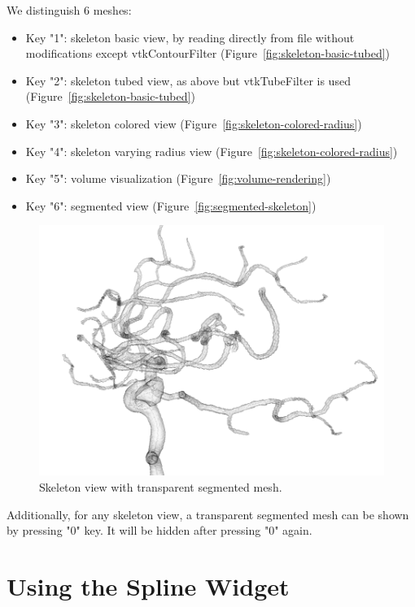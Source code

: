 We distinguish 6 meshes:
\begin{itemize}
	\item Key "1": skeleton basic view, by reading directly from file without modifications except vtkContourFilter (Figure~\ref{fig:skeleton-basic-tubed})
	\item Key "2": skeleton tubed view, as above but vtkTubeFilter is used (Figure~\ref{fig:skeleton-basic-tubed})
	\item Key "3": skeleton colored view (Figure~\ref{fig:skeleton-colored-radius})
	\item Key "4": skeleton varying radius view (Figure~\ref{fig:skeleton-colored-radius})
	\item Key "5": volume visualization (Figure~\ref{fig:volume-rendering})
	\item Key "6": segmented view (Figure~\ref{fig:segmented-skeleton})
\end{itemize}

\begin{figure}
	\centering
	\includegraphics[scale=0.4]{fig/skeleton-transparent-segmented}
	\caption{Skeleton view with transparent segmented mesh.}
	\label{fig:skeleton-transparent-segmented}
\end{figure}


Additionally, for any skeleton view, a transparent segmented mesh can be shown by pressing "0" key. It will be hidden after pressing "0" again.

\section{Using the Spline Widget}

